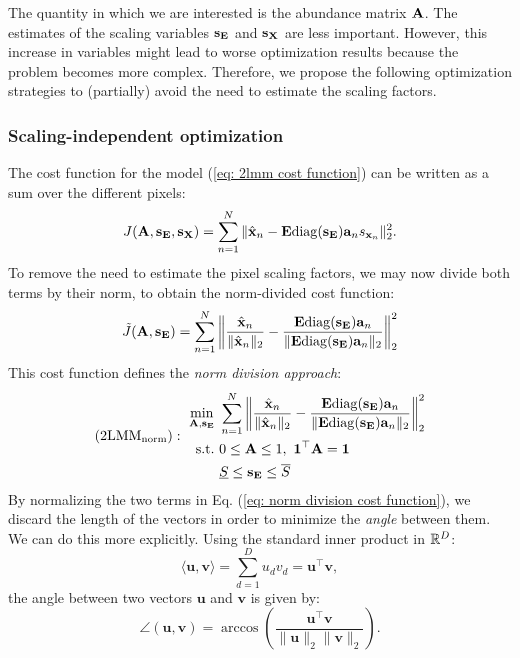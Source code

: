 The quantity in which we are interested is the abundance matrix $\mathbf{A}$. The estimates of the scaling variables $\mathbf{s}_{\mathbf{E}}$ and $\mathbf{s}_{\mathbf{X}}$ are less important. However, this increase in variables might lead to worse optimization results because the problem becomes more complex. Therefore, we propose the following optimization strategies to (partially) avoid the need to estimate the scaling factors.

\subsubsection{Scaling-independent optimization}

The cost function for the model (\ref{eq: 2lmm cost function}) can be written as a sum over the different pixels:
\[
J(\mathbf{A}, \mathbf{s}_{\mathbf{E}}, \mathbf{s}_{\mathbf{X}}) = \sum_{n=1}^N \| \hat{\mathbf{x}}_n - \mathbf{E} \mathrm{diag}(\mathbf{s}_{\mathbf{E}}) \mathbf{a}_n s_{\mathbf{x}_n}\|_2^2.
\]
To remove the need to estimate the pixel scaling factors, we may now divide both terms by their norm, to obtain the norm-divided cost function:
\begin{equation} \label{eq: norm division cost function}
    \Tilde{J}(\mathbf{A}, \mathbf{s}_{\mathbf{E}}) = \sum_{n=1}^N \left\| \frac{\hat{\mathbf{x}}_n}{\|\hat{\mathbf{x}}_n\|_2} - \frac{\mathbf{E} \mathrm{diag}(\mathbf{s}_{\mathbf{E}}) \mathbf{a}_n}{\|\mathbf{E} \mathrm{diag}(\mathbf{s}_{\mathbf{E}}) \mathbf{a}_n\|_2}\right\|_2^2
\end{equation}
This cost function defines the \textit{norm division approach}:
\begin{equation} \label{eq: norm division}
   (\mathrm{2LMM}_\mathrm{norm}):~
   \begin{aligned}
        \min_{\mathbf{A}, \mathbf{s}_{\mathbf{E}}} &~\sum_{n=1}^N \left\| \frac{\hat{\mathbf{x}}_n}{\|\hat{\mathbf{x}}_n\|_2} - \frac{\mathbf{E} \mathrm{diag}(\mathbf{s}_{\mathbf{E}}) \mathbf{a}_n}{\|\mathbf{E} \mathrm{diag}(\mathbf{s}_{\mathbf{E}}) \mathbf{a}_n\|_2}\right\|_2^2 \\
    \text{s.t.} &~ 0 \leq \mathbf{A} \leq 1,~\mathbf{1}^\top \mathbf{A} = \mathbf{1}  \\
    &~ \underline{S} \leq \mathbf{s}_{\mathbf{E}} \leq \overline{S}
\end{aligned}
\end{equation}
By normalizing the two terms in Eq. (\ref{eq: norm division cost function}), we discard the length of the vectors in order to minimize the \textit{angle} between them. We can do this more explicitly. Using the standard inner product in $\mathbb{R}^D$:
\[
\langle \mathbf{u}, \mathbf{v} \rangle = \sum_{d=1}^D u_d v_d = \mathbf{u}^\top \mathbf{v},
\]
the angle between two vectors $\mathbf{u}$ and $\mathbf{v}$ is given by:
\[
\angle(\mathbf{u},\mathbf{v}) = \arccos \left( \frac{\mathbf{u}^\top \mathbf{v}}{\|\mathbf{u}\|_2 \|\mathbf{v}\|_2}\right).
\]
